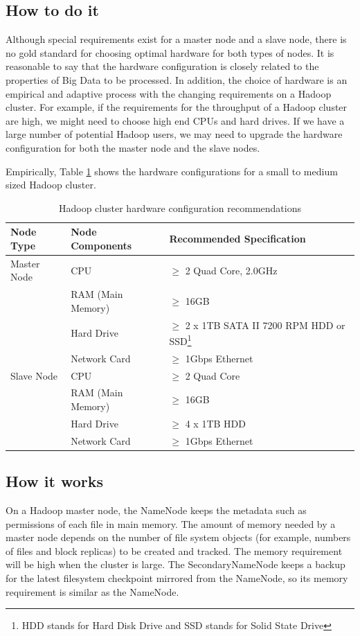 \subsection*{How to do it}
Although special requirements exist for a master node and a slave node, there is no gold standard for choosing optimal hardware for both types of nodes. It is reasonable to say that the hardware configuration is closely related to the properties of Big Data to be processed. In addition, the choice of hardware is an empirical and adaptive process with the changing requirements on a Hadoop cluster. For example, if the requirements for the throughput of a Hadoop cluster are high, we might need to choose high end CPUs and hard drives. If we have a large number of potential Hadoop users, we may need to upgrade the hardware configuration for both the master node and the slave nodes.

Empirically, Table \ref{tbl:cluster.hardware} shows the hardware configurations for a small to medium sized Hadoop cluster. 
\begin{table}[h]
  \centering
  \begin{tabular}{lll}
    \toprule
    \textbf{Node Type} & \textbf{Node Components} & \textbf{Recommended Specification} \\ \midrule
    Master Node & CPU	& $\ge$ 2 Quad Core, 2.0GHz \\
    & RAM (Main Memory) & $\ge$ 16GB \\
    & Hard Drive & $\ge$ 2 x 1TB SATA II 7200 RPM HDD or SSD\footnote{HDD stands for Hard Disk Drive and SSD stands for Solid State Drive} \\
    & Network Card & $\ge$ 1Gbps Ethernet \\ \midrule
    Slave Node & CPU & $\ge$ 2 Quad Core \\
    & RAM (Main Memory) & $\ge$ 16GB \\
    & Hard Drive & $\ge$ 4 x 1TB HDD \\
    & Network Card & $\ge$ 1Gbps Ethernet \\ \bottomrule
  \end{tabular}
  \caption{Hadoop cluster hardware configuration recommendations}\label{tbl:cluster.hardware}
\end{table}
\subsection*{How it works}
On a Hadoop master node, the NameNode keeps the metadata such as permissions of each file in main memory. The amount of memory needed by a master node depends on the number of file system objects (for example, numbers of files and block replicas) to be created and tracked. The memory requirement will be high when the cluster is large. The SecondaryNameNode keeps a backup for the latest filesystem checkpoint mirrored from the NameNode, so its memory requirement is similar as the NameNode.

